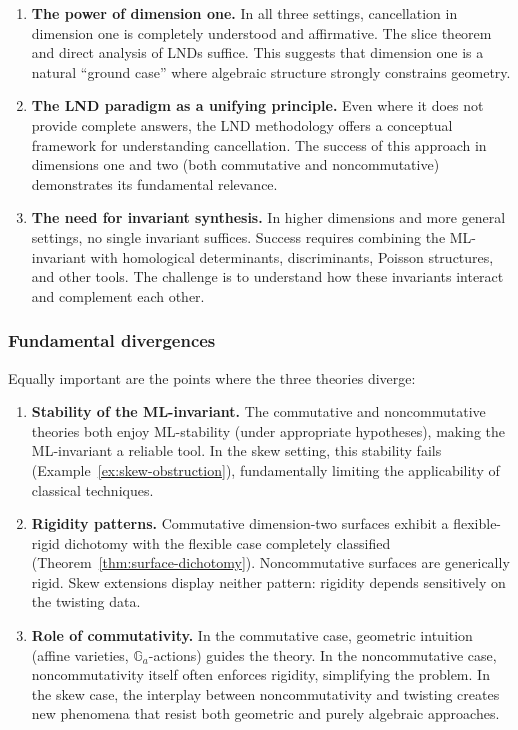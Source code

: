 \documentclass{amsart}
\theoremstyle{plain}
\numberwithin{theorem}{section}
\numberwithin{equation}{theorem}
\theoremstyle{definition}
\begin{document}
\begin{enumerate}
\item \textbf{The power of dimension one.} In all three settings, cancellation in dimension one is completely understood and affirmative. The slice theorem and direct analysis of LNDs suffice. This suggests that dimension one is a natural ``ground case'' where algebraic structure strongly constrains geometry.

\item \textbf{The LND paradigm as a unifying principle.} Even where it does not provide complete answers, the LND methodology offers a conceptual framework for understanding cancellation. The success of this approach in dimensions one and two (both commutative and noncommutative) demonstrates its fundamental relevance.

\item \textbf{The need for invariant synthesis.} In higher dimensions and more general settings, no single invariant suffices. Success requires combining the ML-invariant with homological determinants, discriminants, Poisson structures, and other tools. The challenge is to understand how these invariants interact and complement each other.
\end{enumerate}

\subsubsection*{Fundamental divergences}

Equally important are the points where the three theories diverge:

\begin{enumerate}
\item \textbf{Stability of the ML-invariant.} The commutative and noncommutative theories both enjoy ML-stability (under appropriate hypotheses), making the ML-invariant a reliable tool. In the skew setting, this stability fails (Example~\ref{ex:skew-obstruction}), fundamentally limiting the applicability of classical techniques.

\item \textbf{Rigidity patterns.} Commutative dimension-two surfaces exhibit a flexible-rigid dichotomy with the flexible case completely classified (Theorem~\ref{thm:surface-dichotomy}). Noncommutative surfaces are generically rigid. Skew extensions display neither pattern: rigidity depends sensitively on the twisting data.

\item \textbf{Role of commutativity.} In the commutative case, geometric intuition (affine varieties, $\mathbb{G}_a$-actions) guides the theory. In the noncommutative case, noncommutativity itself often enforces rigidity, simplifying the problem. In the skew case, the interplay between noncommutativity and twisting creates new phenomena that resist both geometric and purely algebraic approaches.
\end{enumerate}
\end{document}
